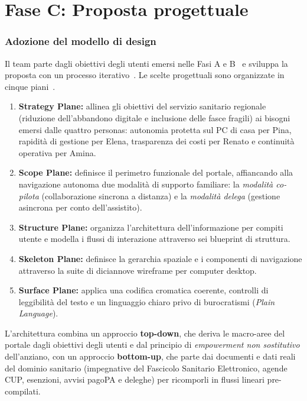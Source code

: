 \chapter{Fase C: Proposta progettuale}

\label{doc:c:01}

\subsection{Adozione del modello di design}

Il team parte dagli obiettivi degli utenti emersi nelle Fasi A e B~\cite{cooperAboutFace2007} e sviluppa la proposta con un processo iterativo~\cite{iso9241210_2010}. Le scelte progettuali sono organizzate in cinque piani~\cite{garrettElements2011}.
\begin{enumerate}
\item \textbf{Strategy Plane:} allinea gli obiettivi del servizio sanitario regionale (riduzione dell'abbandono digitale e inclusione delle fasce fragili) ai bisogni emersi dalle quattro personas: autonomia protetta sul PC di casa per Pina, rapidità di gestione per Elena, trasparenza dei costi per Renato e continuità operativa per Amina.
\item \textbf{Scope Plane:} definisce il perimetro funzionale del portale, affiancando alla navigazione autonoma due modalità di supporto familiare: la \emph{modalità co-pilota} (collaborazione sincrona a distanza) e la \emph{modalità delega} (gestione asincrona per conto dell'assistito).
\item \textbf{Structure Plane:} organizza l'architettura dell'informazione per compiti utente e modella i flussi di interazione attraverso sei blueprint di struttura.
\item \textbf{Skeleton Plane:} definisce la gerarchia spaziale e i componenti di navigazione attraverso la suite di diciannove wireframe per computer desktop.
\item \textbf{Surface Plane:} applica una codifica cromatica coerente, controlli di leggibilità del testo e un linguaggio chiaro privo di burocratismi (\emph{Plain Language}).
\end{enumerate}

L'architettura combina un approccio \textbf{top-down}, che deriva le macro-aree del portale dagli obiettivi degli utenti e dal principio di \emph{empowerment non sostitutivo} dell'anziano, con un approccio \textbf{bottom-up}, che parte dai documenti e dati reali del dominio sanitario (impegnative del Fascicolo Sanitario Elettronico, agende CUP, esenzioni, avvisi pagoPA e deleghe) per ricomporli in flussi lineari pre-compilati.


